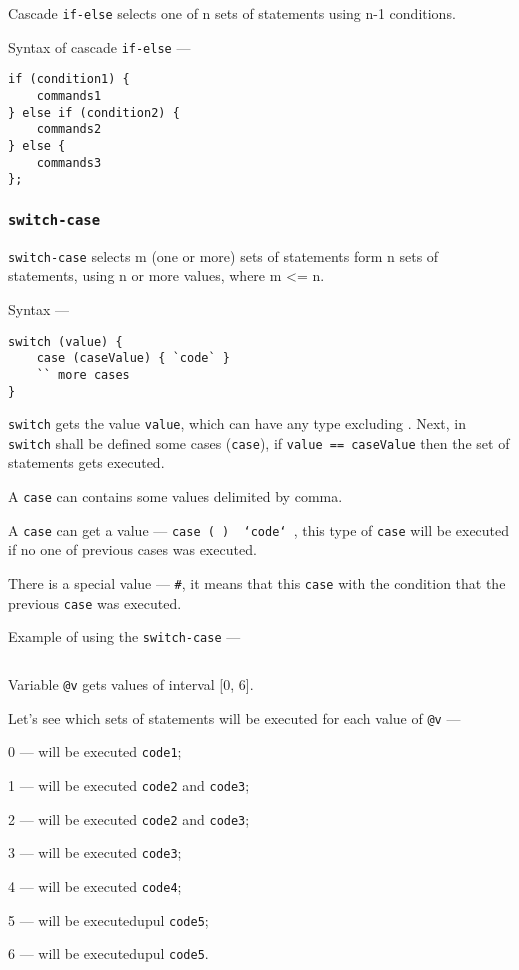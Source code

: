 Cascade \texttt{if-else} selects one of n sets of statements using n-1 conditions.

Syntax of cascade \texttt{if-else} —
\begin{verbatim}
if (condition1) {
	commands1
} else if (condition2) {
	commands2
} else {
	commands3
};
\end{verbatim}

\subsubsection{\texttt{switch-case}}

\texttt{switch-case} selects m (one or more) sets of statements form n sets of statements, using n or more values, where m <= n.

Syntax —
\begin{verbatim}
switch (value) {
	case (caseValue) { `code` }
	`` more cases
}
\end{verbatim}

\texttt{switch} gets the value \texttt{value}, which can have any type excluding \bool. Next, in \texttt{switch} shall be defined some cases (\texttt{case}), if \texttt{value == caseValue} then the set of statements gets executed.

A \texttt{case} can contains some values delimited by comma.

A \texttt{case} can get a \void{} value — \texttt{case (~) { `code` }}, this type of \texttt{case} will be executed if no one of previous cases was executed.

There is a special value — \texttt{#}, it means that this \texttt{case} with the condition that the previous \texttt{case} was executed.

Example of using the \texttt{switch-case} —
\inputminted[linenos]{icl}{../sources/switchcaseex.icL}

Variable \texttt{@v} gets values of interval [0, 6].

\newpage
Let's see which sets of statements will be executed for each value of \texttt{@v} —
\begin{icItems}
	\item 0 — will be executed \texttt{code1};
	\item 1 — will be executed \texttt{code2} and \texttt{code3};
	\item 2 — will be executed \texttt{code2} and \texttt{code3};
	\item 3 — will be executed \texttt{code3};
	\item 4 — will be executed \texttt{code4};
	\item 5 — will be executedupul \texttt{code5};
	\item 6 — will be executedupul \texttt{code5}.
\end{icItems}


